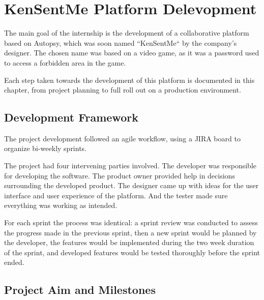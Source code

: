 
\chapter{KenSentMe Platform Delevopment}
\label{ch:development}


The main goal of the internship is the development of a collaborative platform based on Autopsy, which was soon named ``KenSentMe`` by the company's designer. 
The chosen name was based on a video game, as it was a password used to access a forbidden area in the game.



Each step taken towards the development of this platform is documented in this chapter, from project planning to full roll out on a production environment.

\section{Development Framework}

The project development followed an agile workflow, using a JIRA \cite{jira} board to organize bi-weekly sprints.

The project had four intervening parties involved. The developer was responsible for developing the software. The product owner provided help in decisions surrounding the developed product. 
The designer came up with ideas for the user interface and user experience of the platform. And the tester made sure everything was working as intended.

For each sprint the process was identical: a sprint review was conducted to assess the progress made in the previous sprint, then a new sprint would be planned by the developer, 
the features would be implemented during the two week duration of the sprint, and developed features would be tested thoroughly before the sprint ended.

\section{Project Aim and Milestones}

